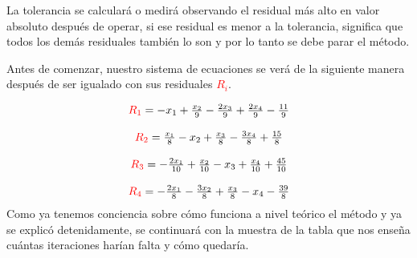 \documentclass{article}
\begin{document}
La tolerancia se calculará o medirá observando el residual más alto en valor absoluto después de operar, si ese residual es menor
a la tolerancia, significa que todos los demás residuales también lo son y por lo tanto se debe parar el método.


Antes de comenzar, nuestro sistema de ecuaciones se verá de la siguiente manera después de ser igualado con sus residuales \textcolor{red}{$R_i$}.


\begin{equation*}
   \begin{matrix}
       \textcolor{red}{R_1} = -x_1 + \frac{x_2}{9} - \frac{2x_3}{9} +\frac{2x_4}{9} - \frac{11}{9}\\
       \\
       \textcolor{red}{R_2} = \frac{x_1}{8} - x_2 + \frac{x_3}{8} - \frac{3x_4}{8} + \frac{15}{8}\\
       \\
       \textcolor{red}{R_3} = -\frac{2x_1}{10} + \frac{x_2}{10} - x_3+ \frac{x_4}{10} + \frac{45}{10}\\
       \\
       \textcolor{red}{R_4} = - \frac{2x_1}{8} - \frac{3x_2}{8} + \frac{x_3}{8} - x_4 - \frac{39}{8}
   \end{matrix}
\end{equation*}
Como ya tenemos conciencia sobre cómo funciona a nivel teórico el método y ya se explicó detenidamente, se continuará con la
muestra de la tabla que nos enseña cuántas iteraciones harían falta y cómo quedaría.
\newpage
\pagestyle{empty}
\end{document}
